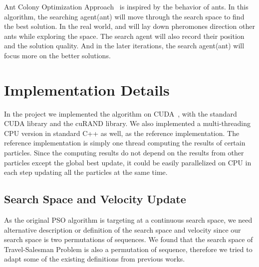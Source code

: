 \documentclass{article}
\begin{document}
Ant Colony Optimization Approach~\cite{Arora2013CIRCUITPI} is inspired by the behavior of ants. In this algorithm, the searching agent(ant) will move through the search space to find the best solution. In the real world, and will lay down pheromones direction other ants while exploring the space. The search agent will also record their position and the solution quality. And in the later iterations, the search agent(ant) will focus more on the better solutions.

\section{Implementation Details}
\label{sec:orgb36a7e8}
In the project we implemented the algorithm on CUDA~\cite{cuda}, with the standard CUDA library and the cuRAND library. We also implemented a multi-threading CPU version in standard C++ as well, as the reference implementation. The reference implementation is simply one thread computing the results of certain particles. Since the computing results do not depend on the results from other particles except the global best update, it could be easily parallelized on CPU in each step updating all the particles at the same time. 
\subsection{Search Space and Velocity Update}
\label{sec:org8c66f6c}
As the original PSO algorithm is targeting at a continuous search space, we need alternative description or definition of the search space and velocity since our search space is two permutations of sequences. We found that the search space of Travel-Salesman Problem is also a permutation of sequence, therefore we tried to adapt some of the existing definitions from previous works.
\end{document}
